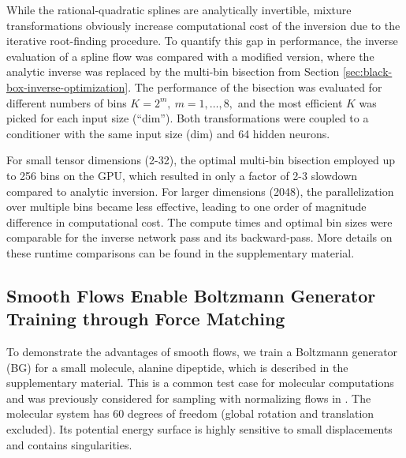\documentclass{article}
\begin{document}
While the rational-quadratic splines are analytically invertible, mixture transformations obviously increase computational cost of the inversion due to the iterative root-finding procedure. To quantify this gap in performance, the inverse evaluation of a spline flow was compared with a modified version, where the analytic inverse was replaced by the multi-bin bisection from Section \ref{sec:black-box-inverse-optimization}. The performance of the bisection was evaluated for different numbers of bins $K=2^m,\ m=1,\dots,8,$ and the most efficient $K$ was picked for each input size (``dim''). Both transformations were coupled to a conditioner with the same input size (dim) and 64 hidden neurons. 

For small tensor dimensions (2-32), the optimal multi-bin bisection employed up to 256 bins on the GPU, which resulted in only a factor of 2-3 slowdown compared to analytic inversion. For larger dimensions (2048), the parallelization over multiple bins became less effective, leading to one order of magnitude difference in computational cost. The compute times and optimal bin sizes were comparable for the inverse network pass and its backward-pass. More details on these runtime comparisons can be found in the supplementary material.



\subsection{Smooth Flows Enable Boltzmann Generator Training through Force Matching}
\label{sec:smooth_fm}
To demonstrate the advantages of smooth flows, we train a Boltzmann generator (BG) for a small molecule, alanine dipeptide, which is described in the supplementary material. %
This is a common test case for molecular computations and was previously considered for sampling with normalizing flows in \cite{wu2020snf, dibak2020temperature, kramer2020training}. The molecular system has 60 degrees of freedom (global rotation and translation excluded). Its potential energy surface is highly sensitive to small displacements \cite{kramer2020training} and contains singularities. 
\end{document}
